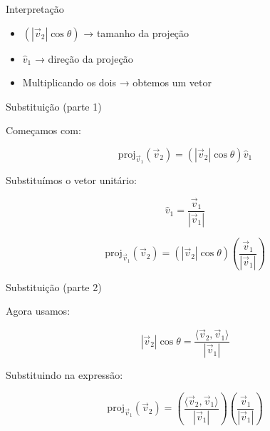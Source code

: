 \documentclass{beamer}
\begin{document}
\begin{frame}{Interpretação}


\vspace{0.5cm}

\begin{itemize}
    \item $(|\vec{v}_2| \cos\theta)$ → tamanho da projeção
    \item $\hat{v}_1$ → direção da projeção
    \item Multiplicando os dois → obtemos um vetor
\end{itemize}

\end{frame}
\begin{frame}{Substituição (parte 1)}


\vspace{0.5cm}

Começamos com:

\[
\mathrm{proj}_{\vec{v}_1}(\vec{v}_2)
=
(|\vec{v}_2|\cos\theta)\hat{v}_1
\]

\vspace{0.5cm}

Substituímos o vetor unitário:

\[
\hat{v}_1 = \frac{\vec{v}_1}{|\vec{v}_1|}
\]

\vspace{0.5cm}

\[
\mathrm{proj}_{\vec{v}_1}(\vec{v}_2)
=
(|\vec{v}_2|\cos\theta)
\left(\frac{\vec{v}_1}{|\vec{v}_1|}\right)
\]

\end{frame}
\begin{frame}{Substituição (parte 2)}


\vspace{0.5cm}

Agora usamos:

\[
|\vec{v}_2|\cos\theta =
\frac{\langle \vec{v}_2 , \vec{v}_1 \rangle}{|\vec{v}_1|}
\]

\vspace{0.5cm}

Substituindo na expressão:

\[
\mathrm{proj}_{\vec{v}_1}(\vec{v}_2)
=
\left(\frac{\langle \vec{v}_2 , \vec{v}_1 \rangle}{|\vec{v}_1|}\right)
\left(\frac{\vec{v}_1}{|\vec{v}_1|}\right)
\]

\end{frame}
\end{document}
